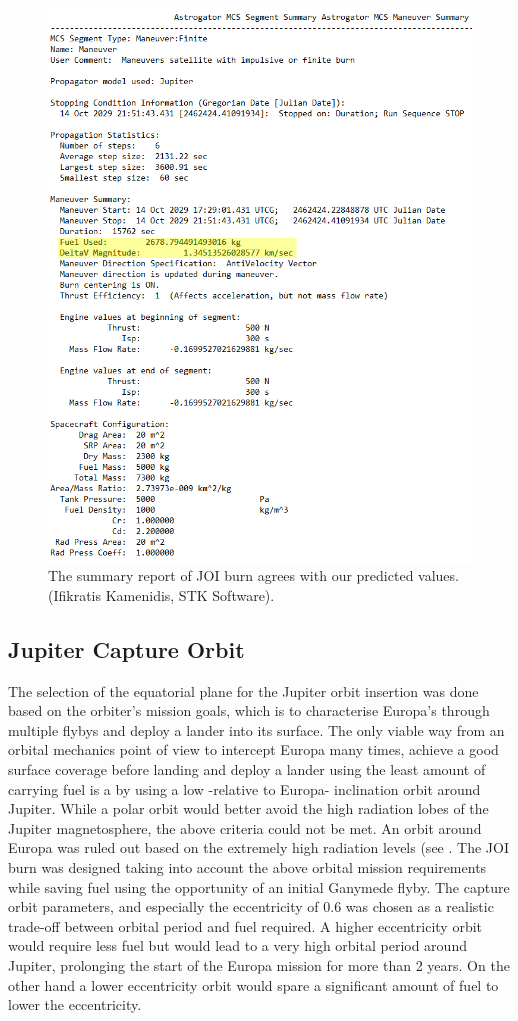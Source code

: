 \begin{figure}[htb!]
\centering
\includegraphics[scale=0.5]{figures/Orbiter/JOIres.png}
\caption{The summary report of JOI burn agrees with our predicted values.(Ifikratis Kamenidis, STK Software).}
\end{figure}

\subsection{Jupiter Capture Orbit}
 The selection of the equatorial plane for the Jupiter orbit insertion was done based on the orbiter's mission goals, which is to characterise Europa’s through multiple flybys and deploy a lander into its surface. The only viable way from an orbital mechanics point of view to intercept Europa many times, achieve a good surface coverage before landing and deploy a lander using the least amount of carrying fuel is a by using a low -relative to Europa- inclination orbit around Jupiter. While a polar orbit would better avoid the high radiation lobes of the Jupiter magnetosphere, the above criteria could not be met. An orbit around Europa was ruled out based on the extremely high radiation levels (see . The JOI burn was designed taking into account the above orbital mission requirements while saving fuel using the opportunity of an initial Ganymede flyby. The capture orbit parameters, and especially the eccentricity of 0.6 was chosen as a realistic trade-off between orbital period and fuel required. A higher eccentricity orbit would require less fuel but would lead to a very high orbital period around Jupiter, prolonging the start of the Europa mission for more than 2 years. On the other hand a lower eccentricity orbit would spare a significant amount of fuel to lower the eccentricity.
